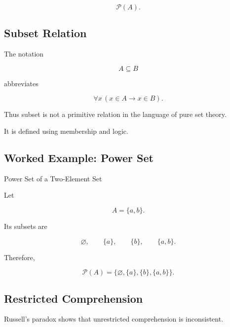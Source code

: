\[
\boxed{
\mathcal{P}(A).
}
\]

\subsection{Subset Relation}
\label{subsec:subset-definition-axiomatic}

The notation

\[
A\subseteq B
\]

abbreviates

\[
\boxed{
\forall x
\,
(x\in A\rightarrow x\in B).
}
\]

Thus subset is not a primitive relation in the language of pure set theory.

It is defined using membership and logic.

\subsection{Worked Example: Power Set}
\label{subsec:worked-power-set}

\begin{workedexamplebox}{Power Set of a Two-Element Set}

Let

\[
A=\{a,b\}.
\]

Its subsets are

\[
\varnothing,
\qquad
\{a\},
\qquad
\{b\},
\qquad
\{a,b\}.
\]

Therefore,

\begin{answerbox}
\[
\boxed{
\mathcal{P}(A)
=
\{
\varnothing,
\{a\},
\{b\},
\{a,b\}
\}.
}
\]
\end{answerbox}

\end{workedexamplebox}

\subsection{Restricted Comprehension}
\label{subsec:restricted-comprehension}

Russell's paradox shows that unrestricted comprehension is inconsistent.


